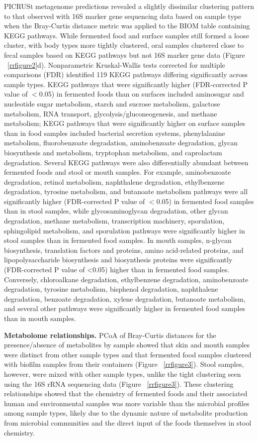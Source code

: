 PICRUSt metagenome predictions revealed a slightly dissimilar clustering pattern to
that observed with 16S marker gene sequencing data based on sample type when the
Bray-Curtis distance metric was applied to the BIOM table containing KEGG pathways.
While fermented food and surface samples still formed a loose cluster, with body types
more tightly clustered, oral samples clustered close to fecal samples based on KEGG pathways
but not 16S marker gene data (Figure ~\ref{rrfigure2}d). Nonparametric Kruskal-Wallis tests
corrected for multiple comparisons (FDR) identified 119 KEGG pathways differing significantly
across sample types. KEGG pathways that were significantly higher (FDR-corrected P value
of $<$0.05) in fermented foods than on surfaces included aminosugar and nucleotide sugar
metabolism, starch and sucrose metabolism, galactose metabolism, RNA transport,
glycolysis/gluconeogenesis, and methane metabolism; KEGG pathways that were significantly
higher on surface samples than in food samples included bacterial secretion systems,
phenylalanine metabolism, fluorobenzoate degradation, aminobenzoate degradation, glycan
biosynthesis and metabolism, tryptophan metabolism, and caprolactam degradation. Several
KEGG pathways were also differentially abundant between fermented foods and stool or mouth
samples. For example, aminobenzoate degradation, retinol metabolism, naphthalene degradation,
ethylbenzene degradation, tyrosine metabolism, and butanoate metabolism pathways were all
significantly higher (FDR-corrected P value of $<$0.05) in fermented food samples than in
stool samples, while glycosaminoglycan degradation, other glycan degradation, methane
metabolism, transcription machinery, sporulation, sphingolipid metabolism, and sporulation
pathways were significantly higher in stool samples than in fermented food samples. In
mouth samples, n-glycan biosynthesis, translation factors and proteins, amino acid-related
proteins, and lipopolysaccharide biosynthesis and biosynthesis proteins were significantly
(FDR-corrected P value of <0.05) higher than in fermented food samples. Conversely,
chloroalkane degradation, ethylbenzene degradation, aminobenzoate degradation, tyrosine
metabolism, bisphenol degradation, naphthalene degradation, benzoate degradation, xylene
degradation, butanoate metabolism, and several other pathways were significantly higher
in fermented food samples than in mouth samples.

\textbf{Metabolome relationships.} PCoA of Bray-Curtis distances for the presence/absence
of metabolites by sample showed that skin and mouth samples were distinct from other
sample types and that fermented food samples clustered with biofilm samples from their
containers (Figure ~\ref{rrfigure3}). Stool samples, however, were mixed with other
sample types, unlike the tight clustering seen using the 16S rRNA sequencing data
(Figure ~\ref{rrfigure3}). These clustering relationships showed that the chemistry
of fermented foods and their associated human and environmental samples was more
variable than the microbial profiles among sample types, likely due to the dynamic
nature of metabolite production from microbial communities and the direct input of
the foods themselves in stool chemistry.

